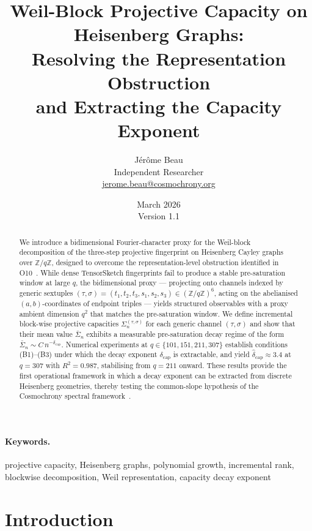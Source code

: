 \documentclass[11pt,a4paper]{article}
\title{Weil-Block Projective Capacity on Heisenberg Graphs:\\
Resolving the Representation Obstruction\\
and Extracting the Capacity Exponent}
\author{J\'{e}r\^{o}me Beau\\
\small Independent Researcher\\
\small \href{mailto:jerome.beau@cosmochrony.org}{jerome.beau@cosmochrony.org}}
\date{March 2026\\[2pt]\small Version 1.1}
\newcommand{\Sigbar}{\bar{\Sigma}}
\newcommand{\Sigblock}{\Sigma_n^{(\tau,\sigma)}}
\newcommand{\dcap}{\delta_{\mathrm{cap}}}
\begin{document}
  \maketitle

  \begin{abstract}
    We introduce a bidimensional Fourier-character proxy for the Weil-block decomposition of the
    three-step projective fingerprint on Heisenberg Cayley graphs over $\mathbb{Z}/q\mathbb{Z}$,
    designed to overcome the representation-level obstruction identified in
    O10~\cite{Beau2026a14}.
    While dense TensorSketch fingerprints fail to produce a stable pre-saturation window at large
    $q$, the bidimensional proxy --- projecting onto channels indexed by generic sextuples
    $(\tau,\sigma) = (t_1,t_2,t_3,s_1,s_2,s_3) \in (\mathbb{Z}/q\mathbb{Z})^6$,
    acting on the abelianised $(a,b)$-coordinates of endpoint triples --- yields structured
    observables with a proxy ambient dimension $q^2$ that matches the pre-saturation window.
    We define incremental block-wise projective capacities $\Sigblock$ for each generic
    channel $(\tau,\sigma)$ and show that their mean value $\Sigbar_n$ exhibits a measurable
    pre-saturation decay regime of the form $\Sigbar_n \sim C\,n^{-\dcap}$.
    Numerical experiments at $q \in \{101, 151, 211, 307\}$ establish conditions (B1)--(B3)
    under which the decay exponent $\dcap$ is extractable, and yield $\hat\dcap \approx 3.4$
    at $q = 307$ with $R^2 = 0.987$, stabilising from $q = 211$ onward.
    These results provide the first operational framework in which a decay exponent can be
    extracted from discrete Heisenberg geometries, thereby testing the common-slope hypothesis
    of the Cosmochrony spectral framework~\cite{Cosmochrony}.
  \end{abstract}

  \paragraph{Keywords.}
    projective capacity, Heisenberg graphs, polynomial growth, incremental rank, blockwise decomposition, Weil
    representation, capacity decay exponent

    \clearpage
    \tableofcontents

    \clearpage

  \section{Introduction}
  \label{sec:intro}
\end{document}
